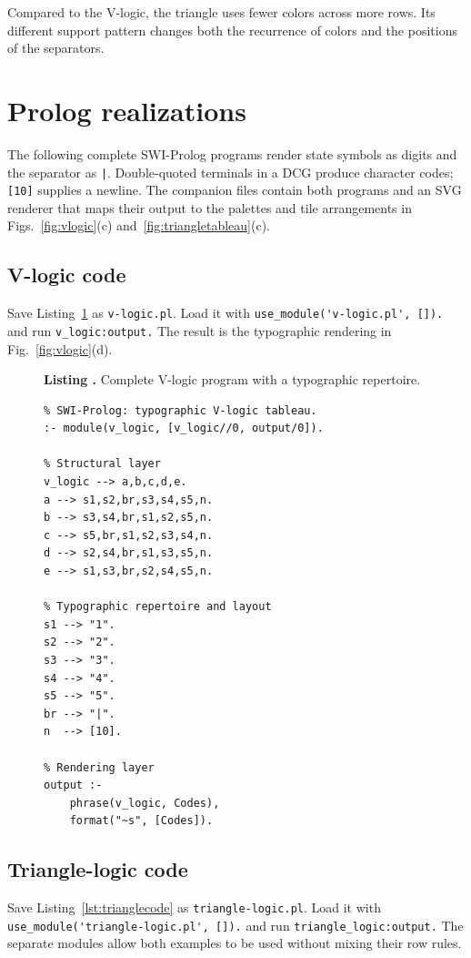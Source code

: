 \documentclass[
  10pt,
  twocolumn,
  aps,
  pra,
  showkeys,
  amsmath,amssymb,
  longbibliography
]{revtex4-2}
\newcounter{listing}
\renewcommand{\thelisting}{\arabic{listing}}
\newcommand{\listingtitle}[2]{%
  \refstepcounter{listing}%
  \par\smallskip
  \noindent\textbf{Listing \thelisting.} #2%
  \label{#1}%
  \par\smallskip
}
\begin{document}
Compared to the V-logic, the triangle uses fewer colors across more rows. Its different support pattern changes both the recurrence of colors and the positions of the separators.



\section{Prolog realizations}

The following complete SWI-Prolog programs render state symbols as digits and the separator as \texttt{|}. Double-quoted terminals in a DCG produce character codes; \texttt{[10]} supplies a newline. The companion files contain both programs and an SVG renderer that maps their output to the palettes and tile arrangements in Figs.~\ref{fig:vlogic}(c) and~\ref{fig:triangletableau}(c).

\subsection{V-logic code}

Save Listing~\ref{lst:vlogiccomplete} as \texttt{v-logic.pl}. Load it with \lstinline!use_module('v-logic.pl', []).! and run \lstinline!v_logic:output.! The result is the typographic rendering in Fig.~\ref{fig:vlogic}(d).

\begin{figure}[tbp]
\listingtitle{lst:vlogiccomplete}{Complete V-logic program with a typographic repertoire.}
\begin{lstlisting}
% SWI-Prolog: typographic V-logic tableau.
:- module(v_logic, [v_logic//0, output/0]).

% Structural layer
v_logic --> a,b,c,d,e.
a --> s1,s2,br,s3,s4,s5,n.
b --> s3,s4,br,s1,s2,s5,n.
c --> s5,br,s1,s2,s3,s4,n.
d --> s2,s4,br,s1,s3,s5,n.
e --> s1,s3,br,s2,s4,s5,n.

% Typographic repertoire and layout
s1 --> "1".
s2 --> "2".
s3 --> "3".
s4 --> "4".
s5 --> "5".
br --> "|".
n  --> [10].

% Rendering layer
output :-
    phrase(v_logic, Codes),
    format("~s", [Codes]).
\end{lstlisting}
\end{figure}

\subsection{Triangle-logic code}

Save Listing~\ref{lst:trianglecode} as \texttt{triangle-logic.pl}. Load it with \lstinline!use_module('triangle-logic.pl', []).! and run \lstinline!triangle_logic:output.! The separate modules allow both examples to be used without mixing their row rules.
\end{document}

